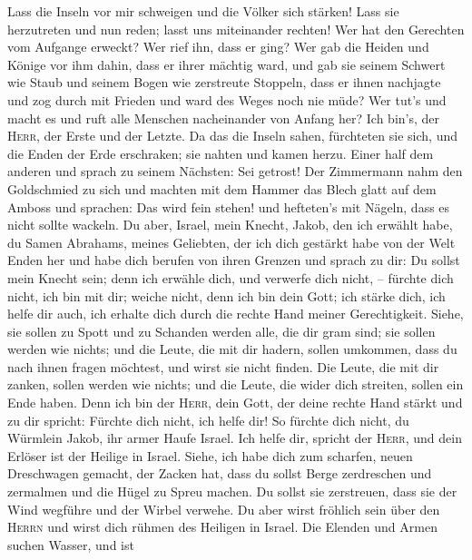  Lass die Inseln vor mir schweigen und die Völker sich
stärken! Lass sie herzutreten und nun reden; lasst uns miteinander
rechten!  Wer hat den Gerechten vom Aufgange erweckt? Wer
rief ihn, dass er ging? Wer gab die Heiden und Könige vor ihm dahin,
dass er ihrer mächtig ward, und gab sie seinem Schwert wie Staub und
seinem Bogen wie zerstreute Stoppeln,  dass er ihnen
nachjagte und zog durch mit Frieden und ward des Weges noch nie müde?
 Wer tut's und macht es und ruft alle Menschen
nacheinander von Anfang her? Ich bin's, der \textsc{Herr}, der Erste und
der Letzte.  Da das die Inseln sahen, fürchteten sie sich,
und die Enden der Erde erschraken; sie nahten und kamen herzu.
 Einer half dem anderen und sprach zu seinem Nächsten: Sei
getrost!  Der Zimmermann nahm den Goldschmied zu sich und
machten mit dem Hammer das Blech glatt auf dem Amboss und sprachen: Das
wird fein stehen! und hefteten's mit Nägeln, dass es nicht sollte
wackeln.  Du aber, Israel, mein Knecht, Jakob, den ich
erwählt habe, du Samen Abrahams, meines Geliebten,  der
ich dich gestärkt habe von der Welt Enden her und habe dich berufen von
ihren Grenzen und sprach zu dir: Du sollst mein Knecht sein; denn ich
erwähle dich, und verwerfe dich nicht, --  fürchte dich
nicht, ich bin mit dir; weiche nicht, denn ich bin dein Gott; ich stärke
dich, ich helfe dir auch, ich erhalte dich durch die rechte Hand meiner
Gerechtigkeit.  Siehe, sie sollen zu Spott und zu
Schanden werden alle, die dir gram sind; sie sollen werden wie nichts;
und die Leute, die mit dir hadern, sollen umkommen,  dass
du nach ihnen fragen möchtest, und wirst sie nicht finden. Die Leute,
die mit dir zanken, sollen werden wie nichts; und die Leute, die wider
dich streiten, sollen ein Ende haben.  Denn ich bin der
\textsc{Herr}, dein Gott, der deine rechte Hand stärkt und zu dir
spricht: Fürchte dich nicht, ich helfe dir!  So fürchte
dich nicht, du Würmlein Jakob, ihr armer Haufe Israel. Ich helfe dir,
spricht der \textsc{Herr}, und dein Erlöser ist der Heilige in Israel.
 Siehe, ich habe dich zum scharfen, neuen Dreschwagen
gemacht, der Zacken hat, dass du sollst Berge zerdreschen und zermalmen
und die Hügel zu Spreu machen.  Du sollst sie zerstreuen,
dass sie der Wind wegführe und der Wirbel verwehe. Du aber wirst
fröhlich sein über den \textsc{Herrn} und wirst dich rühmen des Heiligen
in Israel.  Die Elenden und Armen suchen Wasser, und ist
